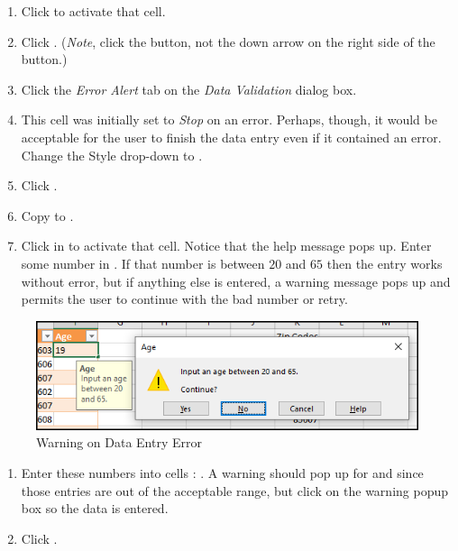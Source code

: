 \begin{enumerate}[resume]	
	\item Click  to activate that cell.
	\item Click . (\textit{Note}, click the button, not the down arrow on the right side of the button.)
	\item Click the \textit{Error Alert} tab on the \textit{Data Validation} dialog box. 
	\item This cell was initially set to \textit{Stop} on an error. Perhaps, though, it would be acceptable for the user to finish the data entry even if it contained an error. Change the Style drop-down to .
	\item Click .
	\item Copy  to .
	\item Click in  to activate that cell. Notice that the help message pops up. Enter some number in . If that number is between $ 20 $ and $ 65 $ then the entry works without error, but if anything else is entered, a warning message pops up and permits the user to continue with the bad number or retry.
\end{enumerate}

\begin{figure}[H]
	\centering
	\includegraphics[width=\maxwidth{.95\linewidth}]{gfx/ch07_fig41}
	\caption{Warning on Data Entry Error}
	\label{07:fig41}
\end{figure}

\begin{enumerate}[resume]	
	\item Enter these numbers into cells : . A warning should pop up for  and  since those entries are out of the acceptable range, but click  on the warning popup box so the data is entered.
	\item Click .
\end{enumerate}

